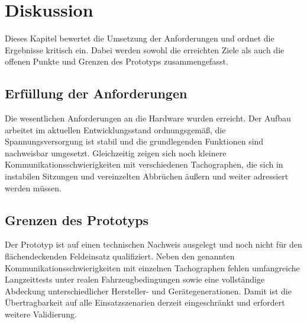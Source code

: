 \chapter{Diskussion}
Dieses Kapitel bewertet die Umsetzung der Anforderungen und ordnet die Ergebnisse kritisch ein. Dabei werden sowohl die erreichten Ziele als auch die offenen Punkte und Grenzen des Prototyps zusammengefasst.

\section{Erfüllung der Anforderungen}
Die wesentlichen Anforderungen an die Hardware wurden erreicht. Der Aufbau arbeitet im aktuellen Entwicklungsstand ordnungsgemäß, die Spannungsversorgung ist stabil und die grundlegenden Funktionen sind nachweisbar umgesetzt. Gleichzeitig zeigen sich noch kleinere Kommunikationsschwierigkeiten mit verschiedenen Tachographen, die sich in instabilen Sitzungen und vereinzelten Abbrüchen äußern und weiter adressiert werden müssen.

\section{Grenzen des Prototyps}
Der Prototyp ist auf einen technischen Nachweis ausgelegt und noch nicht für den flächendeckenden Feldeinsatz qualifiziert. Neben den genannten Kommunikationsschwierigkeiten mit einzelnen Tachographen fehlen umfangreiche Langzeittests unter realen Fahrzeugbedingungen sowie eine vollständige Abdeckung unterschiedlicher Hersteller- und Gerätegenerationen. Damit ist die Übertragbarkeit auf alle Einsatzszenarien derzeit eingeschränkt und erfordert weitere Validierung.
